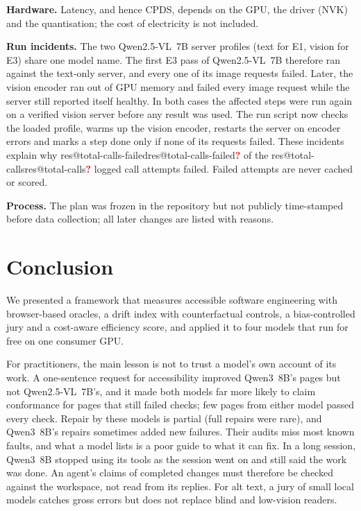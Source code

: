 \documentclass[conference]{IEEEtran}
\makeatletter
\newcommand{\res}[1]{\ifcsname res@#1\endcsname\csname res@#1\endcsname\else\pending{#1}\fi}
\newcommand{\pending}[1]{\textcolor{red}{\textbf{?}}}
\newcommand{\Q}{Qwen3~8B}
\newcommand{\QV}{Qwen2.5-VL~7B}
\makeatother
\begin{document}
\textbf{Hardware.} Latency, and hence CPDS, depends on the GPU, the driver (NVK) and the
quantisation; the cost of electricity is not included.

\textbf{Run incidents.} The two \QV{} server profiles (text for E1, vision for E3) share one model
name. The first E3 pass of \QV{} therefore ran against the text-only server, and every one of its
image requests failed. Later, the vision encoder ran out of GPU memory and failed every image
request while the server still reported itself healthy. In both cases the affected steps were
run again on a verified vision server before any result was used. The run script now
checks the loaded profile, warms up the vision encoder, restarts the server on encoder errors and
marks a step done only if none of its requests failed. These incidents explain why
\res{total-calls-failed} of the \res{total-calls} logged call attempts failed. Failed attempts are
never cached or scored.

\textbf{Process.} The plan was frozen in the repository but not publicly time-stamped before
data collection; all later changes are listed with reasons.

\section{Conclusion}
We presented a framework that measures accessible software engineering with browser-based
oracles, a drift index with counterfactual controls, a bias-controlled jury and a cost-aware
efficiency score, and applied it to four models that run for free on one consumer GPU.

For practitioners, the main lesson is not to trust a model's own account of its work. A
one-sentence request for accessibility improved \Q's pages but not \QV's, and it made both
models far more likely to claim conformance for pages that still failed checks; few pages from
either model passed every check. Repair by these models is partial (full repairs were rare), and
\Q's repairs sometimes added new failures. Their audits miss
most known faults, and what a model lists is a poor guide to what it can fix. In a long session,
\Q{} stopped using its tools as the session went on and still said the work was done. An agent's claims of
completed changes must therefore be checked against the workspace, not read from its replies.
For alt text, a jury of small local models catches gross errors but does not replace blind and
low-vision readers.
\end{document}
